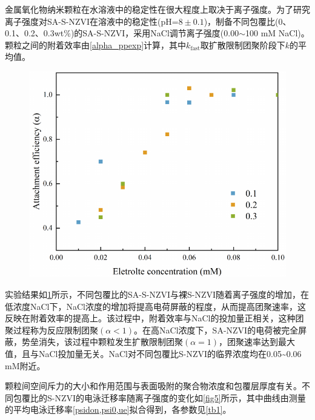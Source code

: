 
金属氧化物纳米颗粒在水溶液中的稳定性在很大程度上取决于离子强度。为了研究离子强度对SA-S-NZVI在溶液中的稳定性(pH=$8\pm 0.1$)，制备不同包覆比(0、0.1、0.2、0.3wt\%)的SA-S-NZVI，采用NaCl调节离子强度(0.00$\sim$100 mM NaCl)。颗粒之间的附着效率由\cref{alpha_ppexp}计算，其中$k_{\mathrm{fast}}$取扩散限制团聚阶段下$k$的平均值。

\begin{figure}[h]
    \centering
   \includegraphics[scale=0.65]{figs/Graph1.pdf}
    \label{fig4}
\end{figure}

实验结果如\cref{fig4}所示，不同包覆比的SA-S-NZVI与裸S-NZVI随着离子强度的增加，在低浓度NaCl下，NaCl浓度的增加将提高电荷屏蔽的程度，从而提高团聚速率，这反映在附着效率的提高上。该过程中，附着效率与NaCl的投加量正相关，这种团聚过程称为反应限制团聚$(\alpha<1)$。在高NaCl浓度下，SA-NZVI的电荷被完全屏蔽，势垒消失，该过程中颗粒发生扩散限制团聚$(\alpha=1)$，团聚速率达到最大值，且与NaCl投加量无关。NaCl对不同包覆比S-NZVI的临界浓度均在0.05\textasciitilde0.06 mM附近。


颗粒间空间斥力的大小和作用范围与表面吸附的聚合物浓度和包覆层厚度有关。不同包覆比的S-NZVI的电泳迁移率随离子强度的变化如\cref{fig5}所示，其中曲线由测量的平均电泳迁移率\cref{psidon,psi0,ue}拟合得到，各参数见\cref{tb1}。

